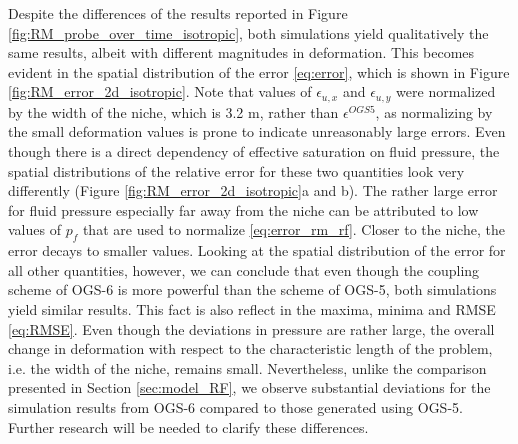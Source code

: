 Despite the differences of the results reported in Figure \ref{fig:RM_probe_over_time_isotropic}, both simulations yield qualitatively the same results, albeit with different magnitudes in deformation. This becomes evident in the spatial distribution of the error \eqref{eq:error}, which is shown in Figure \ref{fig:RM_error_2d_isotropic}. Note that values of $\epsilon_{u,x}$ and $\epsilon_{u,y}$ were normalized by the width of the niche, which is 3.2 m, rather than $\epsilon^{OGS5}$, as normalizing by the small deformation values is prone to indicate unreasonably large errors. Even though there is a direct dependency of effective saturation on fluid pressure, the spatial distributions of the relative error for these two quantities look very differently (Figure \ref{fig:RM_error_2d_isotropic}a and b). The rather large error for fluid pressure especially far away from the niche can be attributed to low values of $p_f$ that are used to normalize \eqref{eq:error_rm_rf}. Closer to the niche, the error decays to smaller values. Looking at the spatial distribution of the error for all other quantities, however, we can conclude that even though the coupling scheme of OGS-6 is more powerful than the scheme of OGS-5, both simulations yield similar results. This fact is also reflect in the maxima, minima and RMSE \eqref{eq:RMSE}. Even though the deviations in pressure are rather large, the overall change in deformation with respect to the characteristic length of the problem, i.e. the width of the niche, remains small. Nevertheless, unlike the comparison presented in Section \ref{sec:model_RF}, we observe substantial deviations for the simulation results from OGS-6 compared to those generated using OGS-5. Further research will be needed to clarify these differences. 

